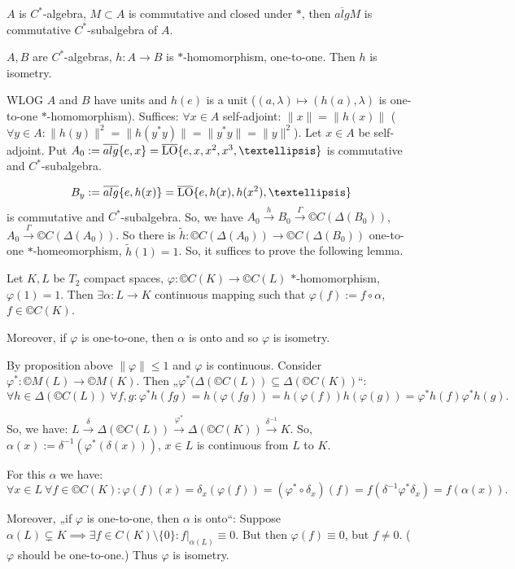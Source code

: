 \documentclass[12pt]{article}					%
\begin{document}
\begin{tvrzeni}[Fact]
	$A$ is $C^*$-algebra, $M \subset A$ is commutative and closed under $*$, then $\overline{alg} M$ is commutative $C^*$-subalgebra of $A$.
\end{tvrzeni}

\begin{veta}
	$A, B$ are $C^*$-algebras, $h: A \rightarrow B$ is $*$-homomorphism, one-to-one. Then $h$ is isometry.

	\begin{dukazin}
		WLOG $A$ and $B$ have units and $h(e)$ is a unit ($(a, λ) \mapsto (h(a), λ)$ is one-to-one $*$-homomorphism). Suffices: $\forall x \in A$ self-adjoint: $\|x\| = \|h(x)\|$ ($\forall y \in A: \|h(y)\|^2 = \|h(y^*y)\| = \|y^* y\| = \|y\|^2$). Let $x \in A$ be self-adjoint. Put $A_0 := \overline{alg}\{e, x\} = \overline{\LO}\{e, x, x^2, x^3, …\}$ is commutative and $C^*$-subalgebra.

		$$ B_y := \overline{alg}\{e, h(x)\} = \overline{\LO}\{e, h(x), h(x^2), …\} $$
		is commutative and $C^*$-subalgebra. So, we have $A_0 \overset{h} \rightarrow B_0 \overset{Γ}\rightarrow ©C(Δ(B_0))$, $A_0 \overset{Γ}\rightarrow ©C(Δ(A_0))$. So there is $\tilde h: ©C(Δ(A_0)) \rightarrow ©C(Δ(B_0))$ one-to-one $*$-homeomorphism, $\tilde h(1) = 1$. So, it suffices to prove the following lemma.
	\end{dukazin}
\end{veta}

\begin{lemma}
	Let $K, L$ be $T_2$ compact spaces, $φ: ©C(K) \rightarrow ©C(L)$ $*$-homomorphism, $φ(1) = 1$. Then $\exists α: L \rightarrow K$ continuous mapping such that $φ(f) := f ∘ α$, $f \in ©C(K)$.

	Moreover, if $φ$ is one-to-one, then $α$ is onto and so $φ$ is isometry.

	\begin{dukazin}
		By proposition above $\|φ\| ≤ 1$ and $φ$ is continuous. Consider $φ^*: ©M(L) \rightarrow ©M(K)$. Then „$φ^*(Δ(©C(L)) \subseteq Δ(©C(K))$“:
		$$ \forall h \in Δ(©C(L))\ \forall f, g: φ^*h(f g) = h(φ(f g)) = h(φ(f))h (φ(g)) = φ^*h(f) φ^*h(g). $$

		So, we have: $L \overset{δ}\rightarrow Δ(©C(L)) \overset{φ^*}\rightarrow Δ(©C(K)) \overset{δ^{-1}} \rightarrow K$. So, $α(x) := δ^{-1}(φ^*(δ(x)))$, $x \in L$ is continuous from $L$ to $K$.

		For this $α$ we have:
		$$ \forall x \in L\ \forall f \in ©C(K): φ(f)(x) = δ_x(φ(f)) = (φ^* ∘ δ_x)(f) = f(δ^{-1} φ^* δ_x) = f(α(x)). $$

		Moreover, „if $φ$ is one-to-one, then $α$ is onto“: Suppose $α(L) \subsetneq K \implies \exists f \in C(K) \setminus \{0\}: f|_{\alpha(L)} ≡ 0$. But then $φ(f) ≡ 0$, but $f ≠ 0$. \lightning ($φ$ should be one-to-one.) Thus $φ$ is isometry.
	\end{dukazin}
\end{lemma}
\end{document}

